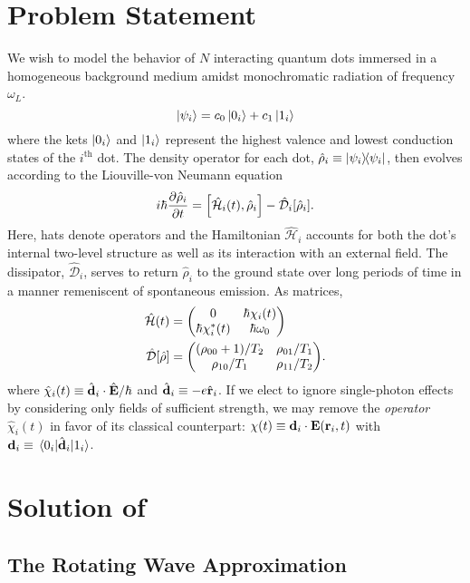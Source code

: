 \documentclass[conference]{IEEEtran}
\begin{document}
\section{Problem Statement}
We wish to model the behavior of $N$ interacting quantum dots immersed in a homogeneous background medium amidst monochromatic radiation of frequency $\omega_L$.
\begin{equation}
  \ket{\psi_i} = c_0 \ket{0_i} + c_1 \ket{1_i}
\end{equation}
where the kets $\ket{0_i}$ and $\ket{1_i}$ represent the highest valence and lowest conduction states of the $i^\text{th}$ dot.
The density operator for each dot, $\hat{\rho}_i \equiv \dyad{\psi_i}$, then evolves according to the Liouville-von Neumann equation
\begin{equation}
  i \hbar \pdv{\hat{\rho}_i}{t} = \commutator{\hat{\mathcal{H}}_i(t)}{\hat{\rho}_i} - \hat{\mathcal{D}}_i\qty[\hat{\rho}_i].
  \label{eq:liouville}
\end{equation}
Here, hats denote operators and the Hamiltonian $\hat{\mathcal{H}}_i$ accounts for both the dot's internal two-level structure as well as its interaction with an external field.
The dissipator, $\hat{\mathcal{D}}_i$, serves to return $\hat{\rho}_i$ to the ground state over long periods of time in a manner remeniscent of spontaneous emission.
As matrices,
\begin{subequations}
  \begin{align}
    \hat{\mathcal{H}}(t) &= \mqty(0 & \hbar \chi_i(t) \\ \hbar \chi_i^*(t) & \hbar \omega_0) \\
    \hat{\mathcal{D}}[\hat{\rho}] &= \mqty((\rho_{00} + 1)/T_2 & \rho_{01}/T_1 \\ \rho_{10}/T_1 & \rho_{11}/T_2).
  \end{align}
\end{subequations}
where $\hat{\chi}_i(t) \equiv \hat{\vb{d}}_i \cdot \hat{\vb{E}}/\hbar$ and $\hat{\vb{d}}_i \equiv -e \hat{\vb{r}}_i$.
If we elect to ignore single-photon effects by considering only fields of sufficient strength,
we may remove the \emph{operator} $\hat{\chi}_i(t)$ in favor of its classical counterpart: $\chi(t) \equiv \vb{d}_i \cdot \vb{E}(\vb{r}_i, t)$ with $\vb{d}_i \equiv \matrixelement{0_i}{\hat{\vb{d}}_i}{1_i}$.
\section{Solution of }
\subsection{The Rotating Wave Approximation}
\end{document}
